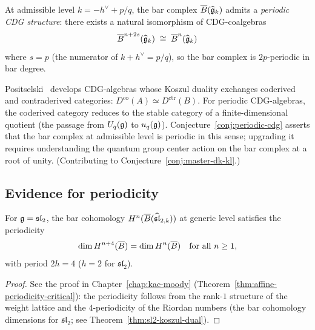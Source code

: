 \begin{conjecture}
\label{conj:periodic-cdg}
At admissible level $k = -h^\vee + p/q$, the bar complex
$\overline{B}(\widehat{\mathfrak{g}}_k)$ admits a \emph{periodic CDG structure}:
there exists a natural isomorphism of CDG-coalgebras
\begin{equation}\label{eq:periodic-cdg}
\overline{B}^{n + 2s}(\widehat{\mathfrak{g}}_k)
\;\cong\;
\overline{B}^n(\widehat{\mathfrak{g}}_k)
\end{equation}
where $s = p$ \textup{(}the numerator of
$k + h^\vee = p/q$\textup{)}, so the bar complex is $2p$-periodic
in bar degree.
\end{conjecture}

\begin{remark}
\label{rem:positselski}
Positselski~\cite{Positselski11} develops CDG-algebras whose
Koszul duality exchanges coderived and contraderived categories:
$D^{\mathrm{co}}(A) \simeq D^{\mathrm{ctr}}(B)$.  For periodic
CDG-algebras, the coderived category reduces to the stable category
of a finite-dimensional quotient (the passage from $U_q(\mathfrak{g})$ to
$u_q(\mathfrak{g})$).  Conjecture~\ref{conj:periodic-cdg} asserts that the
bar complex at admissible level is periodic in this sense; upgrading
it requires understanding the quantum group center action on the bar
complex at a root of unity.
(Contributing to Conjecture~\ref{conj:master-dk-kl}.)
\end{remark}


\subsection{Evidence for periodicity}

\begin{proposition}
\label{prop:sl2-periodicity-dl}
For $\mathfrak{g} = \mathfrak{sl}_2$, the bar cohomology
$H^n(\overline{B}(\widehat{\mathfrak{sl}}_{2,k}))$ at generic level
satisfies the periodicity
\begin{equation}\label{eq:sl2-periodicity}
\dim H^{n+4}(\overline{B})
= \dim H^n(\overline{B})
\quad
\text{for all } n \geq 1,
\end{equation}
with period $2h = 4$ \textup{(}$h = 2$ for $\mathfrak{sl}_2$\textup{)}.
\end{proposition}

\begin{proof}
See the proof in Chapter~\ref{chap:kac-moody}
(Theorem~\ref{thm:affine-periodicity-critical}): the periodicity follows from
the rank-$1$ structure of the weight lattice and the $4$-periodicity
of the Riordan numbers (the bar cohomology dimensions for
$\mathfrak{sl}_2$; see Theorem~\ref{thm:sl2-koszul-dual}).
\end{proof}

